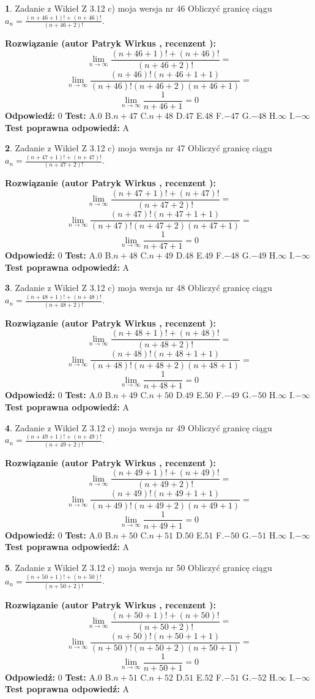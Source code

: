 \documentclass[12pt, a4paper]{article}
\theoremstyle{definition} %
\newtheorem{zad}{}
\newcommand{\zadStart}[1]{\begin{zad}#1\newline}
\newcommand{\zadStop}{\end{zad}}
\newcommand{\rozwStart}[2]{\noindent \textbf{Rozwiązanie (autor #1 , recenzent #2): }\newline}
\newcommand{\rozwStop}{\newline}
\newcommand{\odpStart}{\noindent \textbf{Odpowiedź:}\newline}
\newcommand{\odpStop}{\newline}
\newcommand{\testStart}{\noindent \textbf{Test:}\newline}
\newcommand{\testStop}{\newline}
\newcommand{\kluczStart}{\noindent \textbf{Test poprawna odpowiedź:}\newline}
\newcommand{\kluczStop}{\newline}
\begin{document}
\zadStart{Zadanie z Wikieł Z 3.12 c) moja wersja nr 46}
Obliczyć granicę ciągu $a_{n}=\frac{(n+46+1)!+(n+46)!}{(n+46+2)!}$.
\zadStop
\rozwStart{Patryk Wirkus}{}
$$\lim\limits_{n\to\infty}\frac{(n+46+1)!+(n+46)!}{(n+46+2)!}=$$
$$\lim\limits_{n\to\infty}\frac{(n+46)!(n+46+1+1)}{(n+46)!(n+46+2)(n+46+1)}=$$
$$\lim\limits_{n\to\infty}\frac{1}{n+46+1}= 0$$
\rozwStop
\odpStart
$0$
\odpStop
\testStart
A.$0$
B.$n+47$
C.$n+48$
D.$47$
E.$48$
F.$-47$
G.$-48$
H.$\infty$
I.$-\infty$
\testStop
\kluczStart
A
\kluczStop



\zadStart{Zadanie z Wikieł Z 3.12 c) moja wersja nr 47}
Obliczyć granicę ciągu $a_{n}=\frac{(n+47+1)!+(n+47)!}{(n+47+2)!}$.
\zadStop
\rozwStart{Patryk Wirkus}{}
$$\lim\limits_{n\to\infty}\frac{(n+47+1)!+(n+47)!}{(n+47+2)!}=$$
$$\lim\limits_{n\to\infty}\frac{(n+47)!(n+47+1+1)}{(n+47)!(n+47+2)(n+47+1)}=$$
$$\lim\limits_{n\to\infty}\frac{1}{n+47+1}= 0$$
\rozwStop
\odpStart
$0$
\odpStop
\testStart
A.$0$
B.$n+48$
C.$n+49$
D.$48$
E.$49$
F.$-48$
G.$-49$
H.$\infty$
I.$-\infty$
\testStop
\kluczStart
A
\kluczStop



\zadStart{Zadanie z Wikieł Z 3.12 c) moja wersja nr 48}
Obliczyć granicę ciągu $a_{n}=\frac{(n+48+1)!+(n+48)!}{(n+48+2)!}$.
\zadStop
\rozwStart{Patryk Wirkus}{}
$$\lim\limits_{n\to\infty}\frac{(n+48+1)!+(n+48)!}{(n+48+2)!}=$$
$$\lim\limits_{n\to\infty}\frac{(n+48)!(n+48+1+1)}{(n+48)!(n+48+2)(n+48+1)}=$$
$$\lim\limits_{n\to\infty}\frac{1}{n+48+1}= 0$$
\rozwStop
\odpStart
$0$
\odpStop
\testStart
A.$0$
B.$n+49$
C.$n+50$
D.$49$
E.$50$
F.$-49$
G.$-50$
H.$\infty$
I.$-\infty$
\testStop
\kluczStart
A
\kluczStop



\zadStart{Zadanie z Wikieł Z 3.12 c) moja wersja nr 49}
Obliczyć granicę ciągu $a_{n}=\frac{(n+49+1)!+(n+49)!}{(n+49+2)!}$.
\zadStop
\rozwStart{Patryk Wirkus}{}
$$\lim\limits_{n\to\infty}\frac{(n+49+1)!+(n+49)!}{(n+49+2)!}=$$
$$\lim\limits_{n\to\infty}\frac{(n+49)!(n+49+1+1)}{(n+49)!(n+49+2)(n+49+1)}=$$
$$\lim\limits_{n\to\infty}\frac{1}{n+49+1}= 0$$
\rozwStop
\odpStart
$0$
\odpStop
\testStart
A.$0$
B.$n+50$
C.$n+51$
D.$50$
E.$51$
F.$-50$
G.$-51$
H.$\infty$
I.$-\infty$
\testStop
\kluczStart
A
\kluczStop



\zadStart{Zadanie z Wikieł Z 3.12 c) moja wersja nr 50}
Obliczyć granicę ciągu $a_{n}=\frac{(n+50+1)!+(n+50)!}{(n+50+2)!}$.
\zadStop
\rozwStart{Patryk Wirkus}{}
$$\lim\limits_{n\to\infty}\frac{(n+50+1)!+(n+50)!}{(n+50+2)!}=$$
$$\lim\limits_{n\to\infty}\frac{(n+50)!(n+50+1+1)}{(n+50)!(n+50+2)(n+50+1)}=$$
$$\lim\limits_{n\to\infty}\frac{1}{n+50+1}= 0$$
\rozwStop
\odpStart
$0$
\odpStop
\testStart
A.$0$
B.$n+51$
C.$n+52$
D.$51$
E.$52$
F.$-51$
G.$-52$
H.$\infty$
I.$-\infty$
\testStop
\kluczStart
A
\kluczStop
\end{document}

